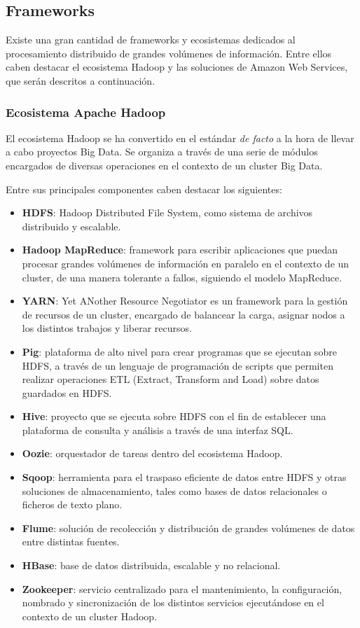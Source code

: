 \subsection{Frameworks}

Existe una gran cantidad de frameworks y ecosistemas dedicados al procesamiento
distribuido de grandes volúmenes de información. Entre ellos caben destacar el
ecosistema Hadoop y las soluciones de Amazon Web Services, que serán descritos a
continuación.


\subsubsection{Ecosistema Apache Hadoop}
\label{sec:eco-hadoop}

El ecosistema Hadoop se ha convertido en el estándar \textit{de facto} a la hora
de llevar a cabo proyectos Big Data. Se organiza a través de una serie de
módulos encargados de diversas operaciones en el contexto de un cluster Big
Data.

Entre sus principales componentes caben destacar los siguientes:

\begin{itemize}
\item \textbf{HDFS}: Hadoop Distributed File System, como sistema de archivos
  distribuido y escalable. 
\item \textbf{Hadoop MapReduce}: framework para escribir aplicaciones que puedan
  procesar grandes volúmenes de información en paralelo en el contexto de un
  cluster, de una manera tolerante a fallos, siguiendo el modelo MapReduce. 
\item \textbf{YARN}: Yet ANother Resource Negotiator es un framework para la
  gestión de recursos de un cluster, encargado de balancear la carga, asignar
  nodos a los distintos trabajos y liberar recursos. 
\item \textbf{Pig}: plataforma de alto nivel para crear programas que se
  ejecutan sobre HDFS, a través de un lenguaje de programación de scripts que
  permiten realizar operaciones ETL (Extract, Transform and Load) sobre datos
  guardados en HDFS. 
\item \textbf{Hive}: proyecto que se ejecuta sobre HDFS con el fin de establecer
  una plataforma de consulta y análisis a través de una interfaz SQL. 
\item \textbf{Oozie}: orquestador de tareas dentro del ecosistema Hadoop. 
\item \textbf{Sqoop}: herramienta para el traspaso eficiente de datos entre HDFS
  y otras soluciones de almacenamiento, tales como bases de datos relacionales o
  ficheros de texto plano. 

\item \textbf{Flume}: solución de recolección y distribución de grandes
  volúmenes de datos entre distintas fuentes.
\item \textbf{HBase}: base de datos distribuida, escalable y no relacional. 
\item \textbf{Zookeeper}: servicio centralizado para el mantenimiento, la
  configuración, nombrado y sincronización de los distintos servicios
  ejecutándose en el contexto de un cluster Hadoop. 
\end{itemize}

